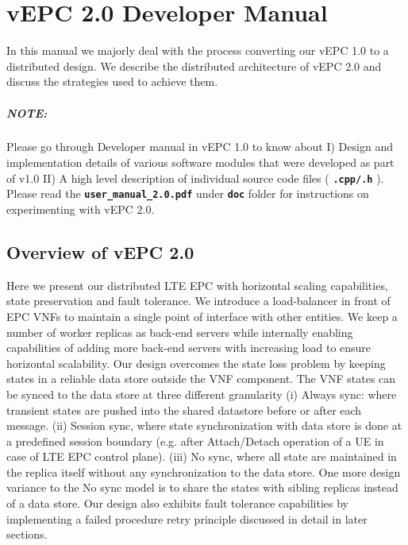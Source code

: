 \documentclass[hidelinks]{report}
\newcommand{\cf}[1] {
	\textbf{\texttt{#1}}
}
\begin{document}

\chapter*{vEPC 2.0 Developer Manual}
In this manual we majorly deal with the process converting our vEPC 1.0 to a distributed design. We describe the distributed architecture of vEPC 2.0 and discuss the strategies used to achieve them.


\paragraph*{NOTE:}

 Please go through Developer manual in vEPC 1.0 to know about I) Design and implementation details of various software modules that were developed as part of v1.0 II) A high level description of individual source code files (\cf{.cpp/.h}). Please read the \cf{user\_manual\_2.0.pdf} under \cf{doc} folder for instructions on experimenting with  vEPC 2.0.
 
\section*{Overview of vEPC 2.0}
Here we present our distributed LTE EPC with horizontal scaling capabilities, state preservation and fault tolerance. We introduce a load-balancer in front of EPC VNFs to maintain a single point of interface with other entities. We keep a number of worker replicas as back-end servers while internally enabling capabilities of adding more back-end servers with increasing load to ensure horizontal scalability. Our design overcomes the state loss problem by keeping states in a reliable data store outside the VNF component. The VNF states can be synced to the data store at three different granularity (i) Always sync: where transient states are pushed into the shared datastore before or after each message. (ii) Session sync,  where state synchronization with data store is done at a predefined session boundary (e.g. after Attach/Detach operation of a UE  in case of LTE EPC control plane). (iii) No sync, where all state are maintained in the replica itself without any synchronization to the data store. One more design variance to the No sync model is to share the states with sibling replicas instead of a data store. Our design also exhibits fault tolerance capabilities by implementing a failed procedure retry principle discussed in detail in later sections.
\end{document}
